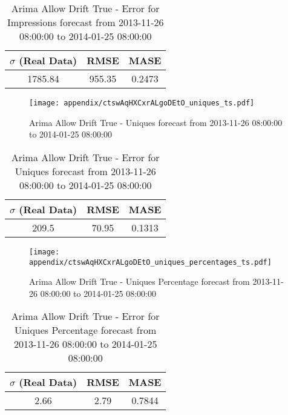 \begin{table}[H]
\centering
\footnotesize
\begin{tabular}{ccc}
$\sigma$ (Real Data) & RMSE & MASE   \\ \hline
1785.84 & 955.35 & 0.2473 \\
\end{tabular}

\vspace{0.5cm}

\caption[]{
Arima Allow Drift True - Error for Impressions forecast from 2013-11-26 08:00:00 to 2014-01-25 08:00:00}
\end{table}

\begin{figure}[H] \begin{center} \leavevmode
\texttt{[image: appendix/ctswAqHXCxrALgoDEtO\_uniques\_ts.pdf]} \caption[]{
Arima Allow Drift True - Uniques forecast from 2013-11-26 08:00:00 to 2014-01-25 08:00:00} \label{fig:appendix/ctswAqHXCxrALgoDEtO_uniques_ts.pdf} \end{center}
\end{figure}

\begin{table}[H]
\centering
\footnotesize
\begin{tabular}{ccc}
$\sigma$ (Real Data) & RMSE & MASE   \\ \hline
209.5 & 70.95 & 0.1313 \\
\end{tabular}

\vspace{0.5cm}

\caption[]{
Arima Allow Drift True - Error for Uniques forecast from 2013-11-26 08:00:00 to 2014-01-25 08:00:00}
\end{table}

\begin{figure}[H] \begin{center} \leavevmode
\texttt{[image: appendix/ctswAqHXCxrALgoDEtO\_uniques\_percentages\_ts.pdf]} \caption[]{
Arima Allow Drift True - Uniques Percentage forecast from 2013-11-26 08:00:00 to 2014-01-25 08:00:00} \label{fig:appendix/ctswAqHXCxrALgoDEtO_uniques_percentages_ts.pdf} \end{center}
\end{figure}

\begin{table}[H]
\centering
\footnotesize
\begin{tabular}{ccc}
$\sigma$ (Real Data) & RMSE & MASE   \\ \hline
2.66 & 2.79 & 0.7844 \\
\end{tabular}

\vspace{0.5cm}

\caption[]{
Arima Allow Drift True - Error for Uniques Percentage forecast from 2013-11-26 08:00:00 to 2014-01-25 08:00:00}
\end{table}

